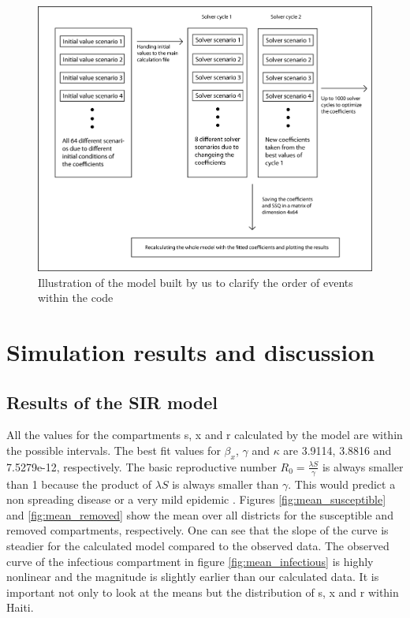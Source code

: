 \documentclass[11pt]{article}
\begin{document}
\begin{center}
\begin{figure}
\includegraphics[scale=.6]{Bilder/Matlab_program.png}
\caption{Illustration of the model built by us to clarify the order of events within the code}
\label{pic:sir_flow_our}
\end{figure}
\end{center}




\newpage
\section{Simulation results and discussion}
\subsection{Results of the SIR model}
All the values for the compartments s, x and r calculated by the model are within the possible intervals. The best fit values for $\beta_{x}$, $\gamma$ and $\kappa$ are 3.9114, 3.8816 and 7.5279e-12, respectively. The basic reproductive number $R_{0} = \frac{\lambda S}{\gamma}$ is always smaller than 1 because the product of $\lambda S$ is always smaller than $\gamma$. This would predict a non spreading disease or a very mild epidemic \cite{kermack:1927}. Figures \ref{fig:mean_susceptible} and \ref{fig:mean_removed} show the mean over all districts for the susceptible and removed compartments, respectively. One can see that the slope of the curve is steadier for the calculated model compared to the observed data. The observed curve of the infectious compartment in figure \ref{fig:mean_infectious} is highly nonlinear and the magnitude is slightly earlier than our calculated data. It is important not only to look at the means but the distribution of s, x and r within Haiti.\\
\end{document}
